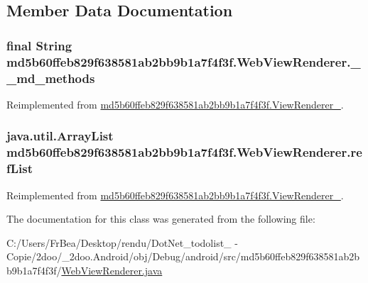 \subsection{Member Data Documentation}
\hypertarget{classmd5b60ffeb829f638581ab2bb9b1a7f4f3f_1_1_web_view_renderer_023fa86f93ecfb325971c3a7204ebc7e}{
\subsubsection[{\_\-\_\-md\_\-methods}]{\setlength{\rightskip}{0pt plus 5cm}final String {\bf md5b60ffeb829f638581ab2bb9b1a7f4f3f.WebViewRenderer.\_\-\_\-md\_\-methods}}}
\label{classmd5b60ffeb829f638581ab2bb9b1a7f4f3f_1_1_web_view_renderer_023fa86f93ecfb325971c3a7204ebc7e}




Reimplemented from \hyperlink{classmd5b60ffeb829f638581ab2bb9b1a7f4f3f_1_1_view_renderer__2_80b609e3e4054c380887d4dc2907a875}{md5b60ffeb829f638581ab2bb9b1a7f4f3f.ViewRenderer\_}.\hypertarget{classmd5b60ffeb829f638581ab2bb9b1a7f4f3f_1_1_web_view_renderer_729d3e7508c2fcb66b26f19a378f0efe}{
\subsubsection[{refList}]{\setlength{\rightskip}{0pt plus 5cm}java.util.ArrayList {\bf md5b60ffeb829f638581ab2bb9b1a7f4f3f.WebViewRenderer.refList}}}
\label{classmd5b60ffeb829f638581ab2bb9b1a7f4f3f_1_1_web_view_renderer_729d3e7508c2fcb66b26f19a378f0efe}




Reimplemented from \hyperlink{classmd5b60ffeb829f638581ab2bb9b1a7f4f3f_1_1_view_renderer__2_6c151401977148a92c515e9c7de1aaf8}{md5b60ffeb829f638581ab2bb9b1a7f4f3f.ViewRenderer\_}.

The documentation for this class was generated from the following file:\begin{CompactItemize}
\item 
C:/Users/FrBea/Desktop/rendu/DotNet\_\-todolist\_ - Copie/2doo/\_\-2doo.Android/obj/Debug/android/src/md5b60ffeb829f638581ab2bb9b1a7f4f3f/\hyperlink{_web_view_renderer_8java}{WebViewRenderer.java}\end{CompactItemize}
